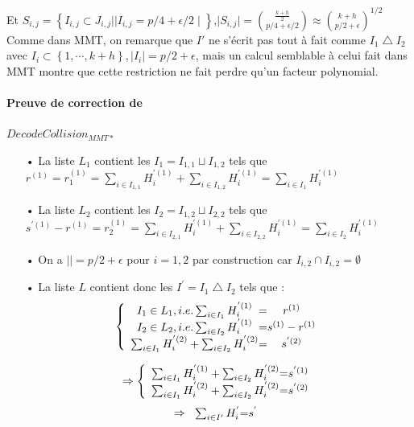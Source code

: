 \documentclass[12pt,openany]{report}
\begin{document}
Et $ S_{i,j} =\left\lbrace  I_{i,j}\subset J_{i,j}  | \mid I_{i,j}=p/4 + \epsilon/2\mid \right\rbrace    $,$\mid S_{i,j} \mid={{\frac{k+h}{2}}\choose {p/4+\epsilon/2}} \approx {{k+h}\choose{p/2+\epsilon}}^{1/2} $\\
Comme dans MMT, on remarque que $ I'  $ ne s'écrit pas tout à fait comme $I_1 \bigtriangleup I_2  $ avec $I_i \subset \left\lbrace 1,\cdots,k+h \right\rbrace , \mid I_i \mid=p/2 + \epsilon   $, mais un calcul semblable à celui fait dans MMT montre que cette restriction ne fait perdre qu'un facteur polynomial.
\paragraph{Preuve de correction de } $DecodeCollision_{MMT*}  $
\begin{itemize}
\item[•] La liste $L_1  $ contient les $I_1=I_{1,1}\sqcup I_{1,2}  $ tels que $ r^{(1)}=r_1^{(1)}=\sum_{i\in I_{1,1}}H_{i}^{'(1)} + \sum_{i \in I_{1,2}}H_{i}^{'(1)}=\sum_{i\in I_1}H_i^{'(1)}  $

\item[•] La liste $L_2 $ contient les $I_2=I_{1,2}\sqcup I_{2,2}  $ tels que $ s^{'(1)}- r^{(1)}=r_2^{(1)}=\sum_{i\in I_{2,1}}H_{i}^{'(1)} + \sum_{i \in I_{2,2}}H_{i}^{'(1)}=\sum_{i\in I_2}H_i^{'(1)}  $
\item[•] On a $\mid \mid = p/2 + \epsilon  $ pour $i=1,2  $ par construction car $ I_{i,2}\cap I_{i,2}=\emptyset $
\item[•] La liste $L$ contient donc les $I^{'}=I_1\bigtriangleup I_2  $ tels que :\\
\[
\left \{
\begin{array}{c @{=} c}
    I_1 \in L_1, i.e. \sum_{i \in I_1}H_i^{'(1)}&r^{(1)}\\
    I_2 \in L_2, i.e. \sum_{i \in I_2}H_i^{'(1)}&s^{(1)}-r^{(1)}\\
    \sum_{i \in I_1}H_i^{'(2)}+\sum_{i \in I_2}H_i^{'(2)}&s^{'(2)}
    
\end{array}
\right.
\]

\[ \Rightarrow
\left \{
\begin{array}{c @{=} c}
    
    \sum_{i \in I_1}H_i^{'(1)}+\sum_{i \in I_2}H_i^{'(2)}&s^{'(1)}\\
     \sum_{i \in I_1}H_i^{'(2)}+\sum_{i \in I_2}H_i^{'(2)}&s^{'(2)}
    
    
\end{array}
\right.
\]
\[ \Rightarrow
\left.
\begin{array}{c @{=} c}
    
    \sum_{i \in I'}H_i^{'}&s^{'}
    
    
\end{array}
\right.
\]


\end{itemize}
\end{document}
